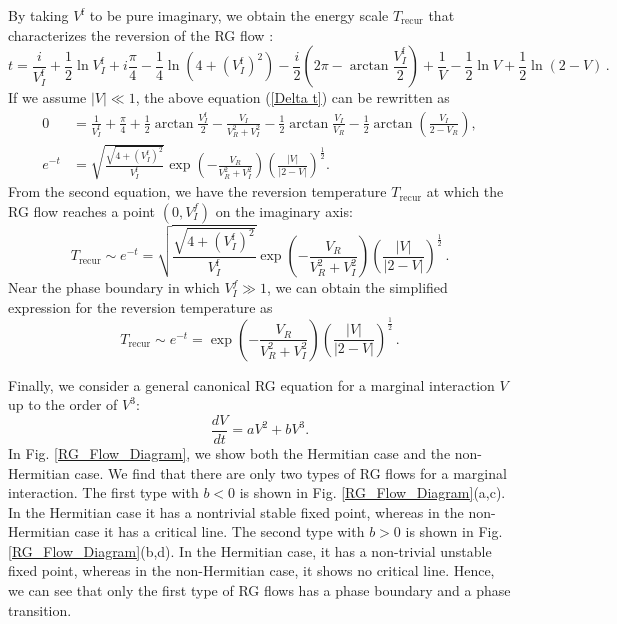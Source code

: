 \documentclass[aps,onecolumn,nofootinbib,superscriptaddress,notitlepage,longbibliography]{revtex4-1}
\begin{document}
By taking $V^{\mathrm{f}}$ to be pure imaginary, we obtain the energy scale $T_{\mathrm{recur}}$ that characterizes the reversion of the RG flow \cite{Nakagawa2018}:
\begin{equation}
	 t=\frac{i}{V_{I}^{\mathrm{f}}}+\frac{1}{2}\ln V_{I}^{\mathrm{f}}+i\frac{\pi}{4}-\frac{1}{4}\ln(4+(V_{I}^{\mathrm{f}})^{2})-\frac{i}{2}(2\pi-\arctan\frac{V_{I}^{\mathrm{f}}}{2})+\frac{1}{V}-\frac{1}{2}\ln V+\frac{1}{2}\ln(2-V)\,.
	\label{Delta t}
\end{equation}
If we assume $|V|\ll1$, the above equation (\ref{Delta t}) can be rewritten as
\begin{align}
		0 & =\frac{1}{V_{I}^{\mathrm{f}}}+\frac{\pi}{4}+\frac{1}{2}\arctan\frac{V_{I}^{\mathrm{f}}}{2}-\frac{V_{I}}{V_{R}^{2}+V_{I}^{2}}-\frac{1}{2}\arctan\frac{V_{I}}{V_{R}}-\frac{1}{2}\arctan(\frac{V_{I}}{2-V_{R}}),\\
		e^{-t} & =\sqrt{\frac{\sqrt{4+(V_{I}^{\mathrm{f}})^{2}}}{V_{I}^{\mathrm{f}}}}\exp(-\frac{V_{R}}{V_{R}^{2}+V_{I}^{2}})(\frac{|V|}{|2-V|})^{\frac{1}{2}}.
\end{align}
From the second equation, we have the reversion temperature $T_\mathrm{recur}$ at which the RG flow reaches a point $(0,V_I^f)$ on the imaginary axis:
\begin{equation}
  T_{\mathrm{recur}}\sim e^{-t}=\sqrt{\frac{\sqrt{4+(V_{I}^{\mathrm{f}})^{2}}}{V_{I}^{\mathrm{f}}}}\exp(-\frac{V_{R}}{V_{R}^{2}+V_{I}^{2}})(\frac{|V|}{|2-V|})^{\frac{1}{2}}\,.
\end{equation}
Near the phase boundary in which $V_I^f\gg1$, we can obtain the simplified expression for the reversion temperature as
\begin{equation}
  T_{\mathrm{recur}}\sim e^{-t}=\exp(-\frac{V_{R}}{V_{R}^{2}+V_{I}^{2}})(\frac{|V|}{|2-V|})^{\frac{1}{2}}\,.
\end{equation}


Finally, we consider a general canonical RG equation for a marginal interaction $V$ up to the order of $V^3$:
\begin{equation}
	\frac{dV}{dt}=aV^2+bV^3.
	\label{eq:RG_Flow_Equ_Marginal_canonical}
\end{equation}
In Fig. \ref{RG_Flow_Diagram}, we show both the Hermitian case and the non-Hermitian case. We find that there are only two types of RG flows for a marginal interaction. The first type with $b<0$ is shown in Fig. \ref{RG_Flow_Diagram}(a,c). In the Hermitian case it has a nontrivial stable fixed point, whereas in the non-Hermitian case it has a critical line. The second type with $b>0$ is shown in Fig. \ref{RG_Flow_Diagram}(b,d). In the Hermitian case, it has a non-trivial unstable fixed point, whereas in the non-Hermitian case, it shows no critical line. Hence, we can see  that only the first type of RG flows has a phase boundary and a phase transition.
\end{document}
